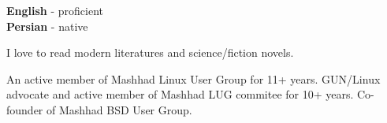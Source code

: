 \documentclass[12pt]{developercv}
\begin{document}
\begin{minipage}[t]{0.3\textwidth}
	\vspace{-\baselineskip} %


	\textbf{English} - proficient\\
	\textbf{Persian} - native\\
\end{minipage}
\hfill
\begin{minipage}[t]{0.3\textwidth}
	\vspace{-\baselineskip} %
	
	
	I love to read modern literatures and science/fiction novels.
\end{minipage}
\hfill
\begin{minipage}[t]{0.3\textwidth}
	\vspace{-\baselineskip} %
	
	
	An active member of Mashhad Linux User Group for 11+  years.
	GUN/Linux advocate and active member of Mashhad LUG commitee
	for 10+ years.
	Co-founder of Mashhad BSD User Group.
	
\end{minipage}

\end{document}
